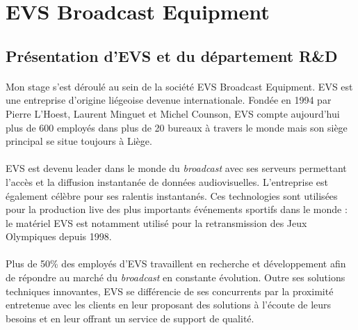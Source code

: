 \documentclass{article}
\begin{document}
    \newpage
    \section{EVS Broadcast Equipment}
    \subsection{Présentation d'EVS et du département R\&D}
    \paragraph{}
    Mon stage s'est déroulé au sein de la société EVS Broadcast Equipment. EVS est une entreprise d'origine liégeoise devenue internationale. Fondée en 1994 par Pierre L'Hoest, Laurent Minguet et Michel Counson, EVS compte aujourd'hui plus de 600 employés dans plus de 20 bureaux à travers le monde mais son siège principal se situe toujours à Liège\cite{EVS:website}.

    \paragraph{}
    EVS est devenu leader dans le monde du \emph{broadcast} avec ses serveurs permettant l'accès et la diffusion instantanée de données audiovisuelles. L'entreprise est également célèbre pour ses ralentis instantanés. Ces technologies sont utilisées pour la production live des plus importants événements sportifs dans le monde : le matériel EVS est notamment utilisé pour la retransmission des Jeux Olympiques depuis 1998.

    \paragraph{}
    Plus de 50\% des employés d'EVS travaillent en recherche et développement afin de répondre au marché du \emph{broadcast} en constante évolution. Outre ses solutions techniques innovantes, EVS se différencie de ses concurrents par la proximité entretenue avec les clients en leur proposant des solutions à l'écoute de leurs besoins et en leur offrant un service de support de qualité.
\end{document}
